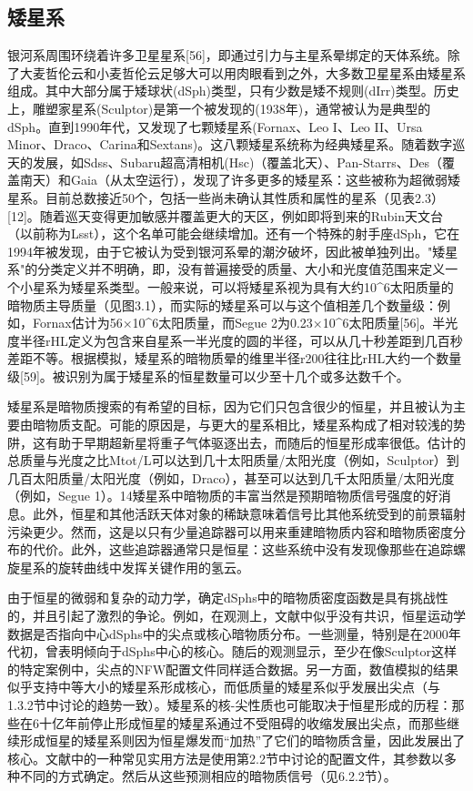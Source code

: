 \subsection{矮星系} 

银河系周围环绕着许多卫星星系[56]，即通过引力与主星系晕绑定的天体系统。除了大麦哲伦云和小麦哲伦云足够大可以用肉眼看到之外，大多数卫星星系由矮星系组成。其中大部分属于矮球状(dSph)类型，只有少数是矮不规则(dIrr)类型。历史上，雕塑家星系(Sculptor)是第一个被发现的(1938年)，通常被认为是典型的dSph。直到1990年代，又发现了七颗矮星系(Fornax、Leo I、Leo II、Ursa Minor、Draco、Carina和Sextans)。这八颗矮星系统称为经典矮星系。随着数字巡天的发展，如Sdss、Subaru超高清相机(Hsc)（覆盖北天）、Pan-Starrs、Des（覆盖南天）和Gaia（从太空运行），发现了许多更多的矮星系：这些被称为超微弱矮星系。目前总数接近50个，包括一些尚未确认其性质和属性的星系（见表2.3）[12]。随着巡天变得更加敏感并覆盖更大的天区，例如即将到来的Rubin天文台（以前称为Lsst），这个名单可能会继续增加。还有一个特殊的射手座dSph，它在1994年被发现，由于它被认为受到银河系晕的潮汐破坏，因此被单独列出。"矮星系"的分类定义并不明确，即，没有普遍接受的质量、大小和光度值范围来定义一个小星系为矮星系类型。一般来说，可以将矮星系视为具有大约10^6太阳质量的暗物质主导质量（见图3.1），而实际的矮星系可以与这个值相差几个数量级：例如，Fornax估计为56×10^6太阳质量，而Segue 2为0.23×10^6太阳质量[56]。半光度半径rHL定义为包含来自星系一半光度的圆的半径，可以从几十秒差距到几百秒差距不等。根据模拟，矮星系的暗物质晕的维里半径r200往往比rHL大约一个数量级[59]。被识别为属于矮星系的恒星数量可以少至十几个或多达数千个。

矮星系是暗物质搜索的有希望的目标，因为它们只包含很少的恒星，并且被认为主要由暗物质支配。可能的原因是，与更大的星系相比，矮星系构成了相对较浅的势阱，这有助于早期超新星将重子气体驱逐出去，而随后的恒星形成率很低。估计的总质量与光度之比Mtot/L可以达到几十太阳质量/太阳光度（例如，Sculptor）到几百太阳质量/太阳光度（例如，Draco），甚至可以达到几千太阳质量/太阳光度（例如，Segue 1）。14矮星系中暗物质的丰富当然是预期暗物质信号强度的好消息。此外，恒星和其他活跃天体对象的稀缺意味着信号比其他系统受到的前景辐射污染更少。然而，这是以只有少量追踪器可以用来重建暗物质内容和暗物质密度分布的代价。此外，这些追踪器通常只是恒星：这些系统中没有发现像那些在追踪螺旋星系的旋转曲线中发挥关键作用的氢云。

由于恒星的微弱和复杂的动力学，确定dSphs中的暗物质密度函数是具有挑战性的，并且引起了激烈的争论。例如，在观测上，文献中似乎没有共识，恒星运动学数据是否指向中心dSphs中的尖点或核心暗物质分布。一些测量，特别是在2000年代初，曾表明倾向于dSphs中心的核心。随后的观测显示，至少在像Sculptor这样的特定案例中，尖点的NFW配置文件同样适合数据。另一方面，数值模拟的结果似乎支持中等大小的矮星系形成核心，而低质量的矮星系似乎发展出尖点（与1.3.2节中讨论的趋势一致）。矮星系的核-尖性质也可能取决于恒星形成的历程：那些在6十亿年前停止形成恒星的矮星系通过不受阻碍的收缩发展出尖点，而那些继续形成恒星的矮星系则因为恒星爆发而“加热”了它们的暗物质含量，因此发展出了核心。文献中的一种常见实用方法是使用第2.2节中讨论的配置文件，其参数以多种不同的方式确定。然后从这些预测相应的暗物质信号（见6.2.2节）。

